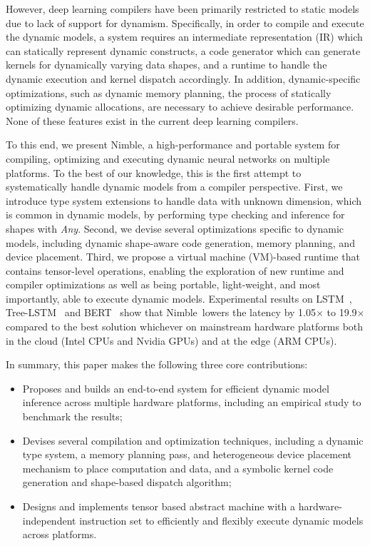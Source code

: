 However, deep learning compilers have been primarily restricted to static models due to lack of support for dynamism.
Specifically, in order to compile and execute the dynamic models, a system requires an intermediate representation (IR) which can statically represent dynamic constructs, a code generator
which can generate kernels for dynamically varying data shapes, and a runtime to handle the dynamic execution and kernel dispatch accordingly.
In addition, dynamic-specific optimizations, such as dynamic memory planning, the process of statically optimizing dynamic allocations, are necessary to achieve desirable performance.
None of these features exist in the current deep learning compilers.

To this end, we present Nimble, a high-performance and portable system for compiling, optimizing and executing dynamic neural networks on multiple platforms.
To the best of our knowledge, this is the first attempt to systematically handle dynamic models from a compiler perspective.
First, we introduce type system extensions to handle data with unknown dimension, which is common in dynamic models, by performing type checking and inference for shapes with {\em Any}.
Second, we devise several optimizations specific to dynamic models, including dynamic shape-aware code generation, memory planning, and device placement.
Third, we propose a virtual machine (VM)-based runtime that contains tensor-level operations, enabling the exploration of new runtime and compiler optimizations as well as
being portable, light-weight, and most importantly, able to execute dynamic models.
Experimental results on LSTM~\citep{lstm}, Tree-LSTM~\citep{tree_lstm} and BERT~\citep{devlin2018bert} show that Nimble~lowers the latency by 1.05$\times$ to 19.9$\times$ compared to the best solution whichever on mainstream hardware platforms both in the cloud (Intel CPUs and Nvidia GPUs) and at the edge (ARM CPUs).

In summary, this paper makes the following three core contributions:
\begin{itemize}
    \item Proposes and builds an end-to-end system for efficient dynamic model inference across multiple hardware platforms, including an empirical study to benchmark the results;
    \item Devises several compilation and optimization techniques,
    including a dynamic type system, a memory planning pass, and heterogeneous device placement mechanism to place computation and data, and a symbolic kernel code generation and shape-based dispatch algorithm;
    \item Designs and implements tensor based abstract machine with a hardware-independent instruction set to efficiently and flexibly execute dynamic models across platforms.
\end{itemize}

